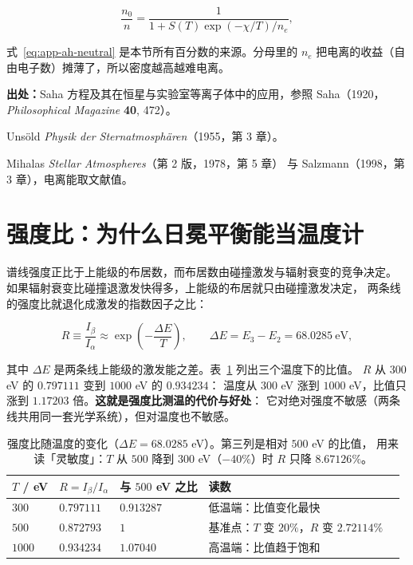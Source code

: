 \begin{equation}
\frac{n_0}{n} = \frac{1}{1+S(T)\exp(-\chi/T)/n_e},
\label{eq:app-ah-neutral}
\end{equation}

式~\eqref{eq:app-ah-neutral} 是本节所有百分数的来源。分母里的 $n_e$ 把电离的收益（自由电子数）摊薄了，所以密度越高越难电离。

{\footnotesize
\textbf{出处：}Saha 方程及其在恒星与实验室等离子体中的应用，参照 Saha（1920，\emph{Philosophical Magazine} \textbf{40}, 472）。

Unsöld \emph{Physik der Sternatmosphären}（1955，第 3 章）。

Mihalas \emph{Stellar Atmospheres}（第 2 版，1978，第 5 章）
与 Salzmann（1998，第 3 章），电离能取文献值。
}

\section{强度比：为什么日冕平衡能当温度计}
\label{sec:app-ah-corona}

谱线强度正比于上能级的布居数，而布居数由碰撞激发与辐射衰变的竞争决定。
如果辐射衰变比碰撞退激发快得多，上能级的布居就只由碰撞激发决定，
两条线的强度比就退化成激发的指数因子之比：

\begin{equation}
R \equiv \frac{I_{\beta}}{I_{\alpha}}
  \approx \exp\!\left(-\frac{\Delta E}{T}\right),
\qquad \Delta E = E_{3} - E_{2} = 68.0285\ \mathrm{eV},
\label{eq:app-ah-corona}
\end{equation}

其中 $\Delta E$ 是两条线上能级的激发能之差。表~\ref{tab:app-ah-intensity} 列出三个温度下的比值。
$R$ 从 $300$ eV 的 $0.797111$ 变到 $1000$ eV 的 $0.934234$：
温度从 $300$ eV 涨到 $1000$ eV，比值只涨到 $1.17203$ 倍。\textbf{这就是强度比测温的代价与好处}：
它对绝对强度不敏感（两条线共用同一套光学系统），但对温度也不敏感。

\begin{table}[htbp]
\centering
\small
\caption{强度比随温度的变化（$\Delta E=68.0285$ eV）。第三列是相对 $500$ eV 的比值，
用来读「灵敏度」：$T$ 从 $500$ 降到 $300$ eV（$-40\%$）时 $R$ 只降 $8.67126\%$。}
\label{tab:app-ah-intensity}
\begin{tabular}{p{2.4cm}p{2.6cm}p{2.9cm}p{4.3cm}p{0.1cm}}
\toprule
$T$ / eV & $R=I_{\beta}/I_{\alpha}$ & 与 $500$ eV 之比 & 读数 & \\
\midrule
$300$ & $0.797111$ & $0.913287$ & 低温端：比值变化最快 & \\
$500$ & $0.872793$ & $1$ & 基准点：$T$ 变 $20\%$，$R$ 变 $2.72114\%$ & \\
$1000$ & $0.934234$ & $1.07040$ & 高温端：比值趋于饱和 & \\
\bottomrule
\end{tabular}

\end{table}

